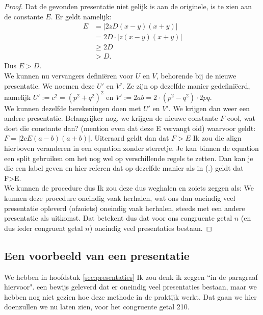 \documentclass[12pt,reqno]{article}
\theoremstyle{theorem}
\theoremstyle{definition}
\begin{document}
\begin{proof}
		Dat de gevonden presentatie niet gelijk is aan de originele, is te zien aan de constante $E$. Er geldt namelijk:
		\begin{align*}
			E &= | 2 z D (x-y) (x+y) | \\
			&= 2 D \cdot | z (x-y) (x+y) | \\
			&\geq 2 D \\
			&> D.
		\end{align*}
		Dus $E > D$.\\
		
		We kunnen nu vervangers defini\"eren voor $U$ en $V$, behorende bij de nieuwe presentatie. We noemen deze $U'$ en $V'$. Ze zijn op dezelfde manier gedefini\"eerd, namelijk $U':=c^2=(p^2+q^2)^2$ en $V':=2ab=2\cdot(p^2-q^2)\cdot2pq$.\\
		
		We kunnen dezelfde berekeningen doen met $U'$ en $V'$. We krijgen dan weer een andere presentatie. Belangrijker nog, we krijgen de nieuwe constante $F$ {\color{red}cool, wat doet die constante dan? (mention even dat deze E vervangt oid)} waarvoor geldt: $F=|2 c E (a-b) (a+b)|.$ Uiteraard geldt dan dat $F > E$ {\color{red}Ik zou die align hierboven veranderen in een equation zonder sterretje. Je kan binnen de equation een split gebruiken om het nog wel op verschillende regels te zetten. Dan kan je die een label geven en hier referen dat op dezelfde manier als in (.) geldt dat F>E}.\\
		
		We kunnen de procedure dus {\color{red}Ik zou deze dus weghalen en zoiets zeggen als: We kunnen deze procedure oneindig vaak herhalen, wat ons dan oneindig veel presentatie opleverd (ofzoiets)} oneindig vaak herhalen, steeds met een andere presentatie als uitkomst. Dat betekent dus dat voor ons congruente getal $n$ (en dus ieder congruent getal $n$) oneindig veel presentaties bestaan.
	\end{proof}
	
	\subsection{Een voorbeeld van een presentatie}
	We hebben in hoofdstuk \ref{sec:presentaties} {\color{red}Ik zou denk ik zeggen ``in de paragraaf hiervoor".} een bewijs geleverd dat er oneindig veel presentaties bestaan, maar we hebben nog niet gezien hoe deze methode in de praktijk werkt. Dat gaan we hier doen{\color{red}zullen we nu laten zien}, voor het congruente getal 210.\\
	
\end{document}
